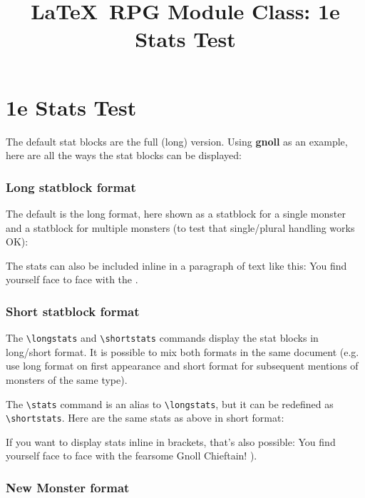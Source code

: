\documentclass[a4paper,sansserif,1e]{rpg-module}
\begin{document}
\title{\textrm{\LaTeX}~RPG Module Class: 1e Stats Test}

\part{1e Stats Test}

The default stat blocks are the full (long) version. Using \textbf{gnoll} as an example, here are all the ways the stat
blocks can be displayed:

\section{Long statblock format}

The default is the long format, here shown as a statblock for a single monster and a statblock for multiple monsters (to
test that single/plural handling works OK):


\noindent The stats can also be included inline in a paragraph of text like this:
You find yourself face to face with the .

\section{Short statblock format}

The \verb|\longstats| and \verb|\shortstats| commands display the stat blocks in long/short format. It is possible to
mix both formats in the same document (e.g. use long format on first appearance and short format for subsequent mentions
of monsters of the same type).

The \verb|\stats| command is an alias to \verb|\longstats|, but it can be redefined as \verb|\shortstats|. Here are the
same stats as above in short format:

\renewcommand{\stats}{\shortstats}


\noindent If you want to display stats inline in brackets, that's also possible: You find yourself face to face with the
fearsome Gnoll Chieftain! \stats[(\ignorespaces]{gnoll}{1}{16}).

\section{New Monster format}
\end{document}
